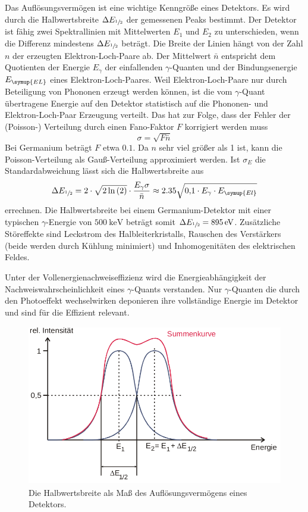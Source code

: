 Das Auflösungsvermögen ist eine wichtige Kenngröße eines Detektors.
Es wird durch die Halbwertsbreite $\Delta E_{\sfrac{1}{2}}$ der gemessenen Peaks bestimmt.
Der Detektor ist fähig zwei Spektrallinien mit Mittelwerten $E_1$ und $E_2$ zu unterschieden, wenn die Differenz mindestens $\Delta E_{\sfrac{1}{2}}$ beträgt.
Die Breite der Linien hängt von der Zahl $n$ der erzeugten Elektron-Loch-Paare ab.
Der Mittelwert $\bar{n}$ entspricht dem Quotienten der Energie $E_{\gamma}$ der einfallenden $\gamma$-Quanten und der Bindungsenergie $E_{\symup{EL}}$ eines Elektron-Loch-Paares.
Weil Elektron-Loch-Paare nur durch Beteiligung von Phononen erzeugt werden können, ist die vom $\gamma$-Quant übertragene Energie auf den Detektor statistisch auf die Phononen- und Elektron-Loch-Paar Erzeugung verteilt.
Das hat zur Folge, dass der Fehler der (Poisson-) Verteilung durch einen Fano-Faktor $F$ korrigiert werden muss
\begin{equation*}
\sigma = \sqrt{F\bar{n}}
\end{equation*}
Bei Germanium beträgt $F$ etwa $0.1$.
Da $n$ sehr viel größer als \num{1} ist, kann die Poisson-Verteilung als Gauß-Verteilung approximiert werden.
Ist $\sigma_E$ die Standardabweichung lässt sich die Halbwertsbreite aus
\begin{equation}
\label{eq:aufloesung}
\Delta E_{\sfrac{1}{2}} = 2 \cdot \sqrt{2\ln{(2)}}\cdot\frac{E_{\gamma}\sigma}{\bar{n}} \approx 2.35\sqrt{\num{0.1} \cdot E_\gamma \cdot E_{\symup{El}}}
\end{equation}
errechnen.
Die Halbwertsbreite bei einem Germanium-Detektor mit einer typischen $\gamma$-Energie von $\SI{500}{\kilo\electronvolt}$ beträgt somit $\Delta E_{\sfrac{1}{2}} =\SI{895}{\electronvolt}$.
Zusätzliche Störeffekte sind Leckstrom des Halbleiterkristalls, Rauschen des Verstärkers (beide werden durch Kühlung minimiert) und Inhomogenitäten des elektrischen Feldes.

Unter der Vollenergienachweiseffizienz wird die Energieabhängigkeit der Nachweiswahrscheinlichkeit eines $\gamma$-Quants verstanden.
Nur $\gamma$-Quanten die durch den Photoeffekt wechselwirken deponieren ihre vollständige Energie im Detektor und sind für die Effizient relevant.

 \begin{figure}
   \centering
   \includegraphics[height=7cm]{content/Breite.png}
   \caption{Die Halbwertsbreite als Maß des Auflösungsvermögens eines Detektors.\cite{V18}}
   \label{fig:Breite}
 \end{figure}

